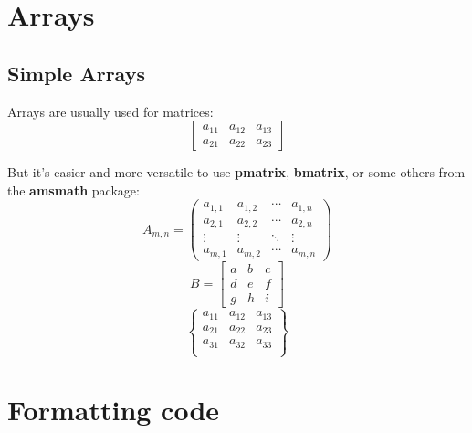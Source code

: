 \documentclass[12pt]{article}
\begin{document}
\section{Arrays}

\subsection{Simple Arrays}

Arrays are usually used for matrices:
\begin{equation*}
    \left[
        \begin{array}{ ccc }
            a_{11} & a_{12} & a_{13} \\
            a_{21} & a_{22} & a_{23}
        \end{array}
    \right]
\end{equation*}

\noindent But it's easier and more versatile to use \textbf{pmatrix}, \textbf{bmatrix}, or some others from the \textbf{amsmath} package: \\
\begin{equation*}
    A_{m,n} =
    \begin{pmatrix}
    a_{1,1} & a_{1,2} & \cdots & a_{1,n} \\
    a_{2,1} & a_{2,2} & \cdots & a_{2,n} \\
    \vdots  & \vdots  & \ddots & \vdots  \\
    a_{m,1} & a_{m,2} & \cdots & a_{m,n}
    \end{pmatrix}
\end{equation*}
\begin{equation*}
    B =
    \begin{bmatrix}
    a & b & c \\
    d & e & f \\
    g & h & i
    \end{bmatrix}
\end{equation*}
\begin{equation*}
    \begin{Bmatrix}
    a_{11} & a_{12} & a_{13}  \\
    a_{21} & a_{22} & a_{23}  \\
    a_{31} & a_{32} & a_{33}  \\
    \end{Bmatrix}
\end{equation*}

\section{Formatting code}
\end{document}
